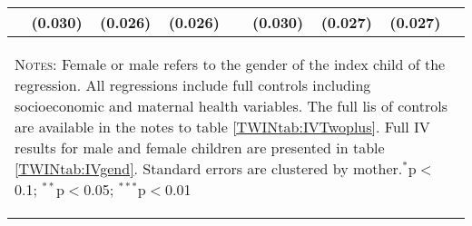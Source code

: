 \begin{table}[htpb!]
\begin{center}
\begin{tabular}{lcccccccc}
&(0.030)&(0.026)&(0.026)&&(0.030)&(0.027)&(0.027)&\\
\midrule\multicolumn{9}{p{14.2cm}}{\begin{footnotesize}\textsc{Notes:} Female or male refers to the gender of the index child of the regression. 
All regressions include full controls including socioeconomic and maternal health variables.  The full lis of controls are available in 
the notes to table \ref{TWINtab:IVTwoplus}.  Full IV results for male and female children are presented in table \ref{TWINtab:IVgend}. Standard errors are clustered 
 by mother.$^{*}$p$<$0.1; $^{**}$p$<$0.05; $^{***}$p$<$0.01
\end{footnotesize}} \\ \bottomrule 
\end{tabular}\end{center}\end{table}